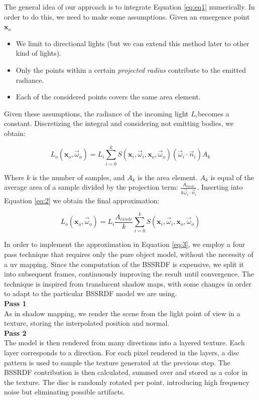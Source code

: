 \documentclass[landscape,a0b,final,a4resizeable]{a0poster}
\newenvironment{poster}{
	\begin{center} \begin{minipage}[c]{0.98\textwidth} }{
	\end{minipage} \end{center}
}
\newcommand{\pbox}[4]{
	\psshadowbox[#3]{
		\begin{minipage}[t][#2][t]{#1}
			#4
		\end{minipage}
}}
\newcommand{\csection}[1]{
\vspace{0.1cm}
\begin{center}
	\pbox{0.8\columnwidth}{}{linewidth=2mm, framearc=0.0, linecolor=lightgreen, fillstyle=gradient,
	                         gradangle=0, gradbegin=white, gradend=whitegreen, gradmidpoint=1.0, framesep=0.6em, shadowsize=0
	                        }{\begin{center}{\bf \large #1}\end{center}}
\end{center}
\vspace{0.1cm}
}
\begin{document}
\begin{poster}
\begin{multicols}{3}
%
\csection{Approximation}

The general idea of our  approach is to integrate Equation \ref{eq:eq1} numerically. In order to do this, we need to make some assumptions. Given an emergence point $\mathbf{x}_o$
\begin{itemize}
  \item We limit to directional lights (but we can extend this method later to other kind of lights).
	\item Only the points within a certain \emph{projected radius} contribute to the emitted radiance.
	\item Each of the considered points covers the same area element. 
\end{itemize}

Given these assumptions, the radiance of the incoming light $L_i$becomes a constant. Discretizing the integral and considering not emitting bodies, we obtain:

\begin{equation}
L_o(\mathbf{x}_o, \vec{\omega}_o) = L_i \sum_{i = 0}^{k} S(\mathbf{x}_i, \vec{\omega}_i,\mathbf{x}_o, \vec{\omega}_o) (\vec{\omega}_i \cdot \vec{n}_i) A_k
\label{eq:2}
\end{equation}

Where $k$ is the number of samples, and $A_k$ is the area element. $A_k$ is equal of the average area of a sample divided by the projection term: $\frac{A_{circle}}{k \vec{\omega}_i \cdot \vec{n}_i}$. Inserting into Equation \ref{eq:2} we obtain the final approximation: 

\begin{equation}
L_o(\mathbf{x}_o, \vec{\omega}_o) = L_i \frac{A_{circle}}{k} \sum_{i = 0}^{k} S(\mathbf{x}_i, \vec{\omega}_i,\mathbf{x}_o, \vec{\omega}_o)
\label{eq:3}
\end{equation}
\vspace{-1cm}
\csection{Implementation}
\vspace{-1cm}
In order to implement the approximation in Equation \ref{eq:3}, we employ a four pass technique that requires only the pure object model, without the necessity of a uv mapping. Since the computation of the BSSRDF is expensive, we split it into subsequent frames, continuously improving the result until convergence. The technique is inspired from translucent shadow maps, with some changes in order to adapt to the particular BSSRDF model we are using.
\\
\textbf{Pass 1} 
\\
As in shadow mapping, we render the scene from the light point of view in a texture, storing the interpolated position and normal.
\\
\textbf{Pass 2} 
\\
The model is then rendered from many directions into a layered texture. Each layer corresponds to a direction. For each pixel rendered in the layers, a disc pattern is used to sample the texture generated at the previous step. The BSSRDF contribution is then calculated, summed over and stored as a color in the texture. The disc is randomly rotated per point, introducing high frequency noise but eliminating possible artifacts. 


\end{multicols}
\end{poster}
\end{document}
